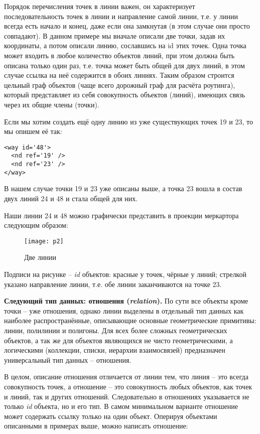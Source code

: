 Порядок перечисления точек в линии важен, он характеризует последовательность 
точек в линии и направление самой линии, т.е. у линии всегда есть начало и 
конец, даже если она замкнутая (в этом случае они просто совпадают). В данном 
примере мы вначале описали две точки, задав их координаты, а потом описали 
линию, сославшись на id этих точек. Одна точка может входить в любое количество 
объектов линий, при этом должна быть описана только один раз, т.е. точка может 
быть общей для двух линий, в этом случае ссылка на неё содержится в обоих 
линиях. Таким образом строится цельный граф объектов (чаще всего дорожный граф 
для расчёта роутинга), который представляет из себя совокупность объектов 
(линий), имеющих связь через их общие члены (точки).

Если мы хотим создать ещё одну линию из уже существующих точек 19 и 23, то мы 
опишем её так:

\begin{verbatim}
<way id='48'>
  <nd ref='19' />
  <nd ref='23' />
</way>
\end{verbatim}

В нашем случае точки 19 и 23 уже описаны выше, а точка 23 вошла в состав двух 
линий 24 и 48 и стала общей для них.

Наши линии 24 и 48 можно графически представить в проекции меркартора следующим 
образом:

\begin{figure}[ht!]
    \texttt{[image: p2]}
    \caption{Две линии}
\end{figure}

Подписи на рисунке -- \emph{id} объектов: красные у точек, чёрные у линий; 
стрелкой указано направление линии, т.е. обе линии заканчиваются на точке 23.

\textbf{Следующий тип данных: отношения (\emph{relation}).} По сути все 
объекты кроме точки -- уже отношения, однако линии выделены в отдельный тип 
данных как наиболее распространённые, описывающие основные геометрические 
примитивы: линии, полилинии и полигоны. Для всех более сложных геометрических 
объектов, а так же для объектов являющихся не чисто геометрическими, а 
логическими (коллекции, списки, иерархии взаимосвязей) предназначен 
универсальный тип данных -- отношения.

В целом, описание отношения отличается от линии тем, что линия -- это всегда 
совокупность точек, а отношение -- это совокупность любых объектов, как точек 
и линий, так и других отношений. Следовательно в отношениях указывается не 
только \emph{id} объекта, но и его тип. В самом минимальном варианте отношение 
может содержать ссылку только на один объект. Оперируя объектами описанными в 
примерах выше, можно написать отношение:

